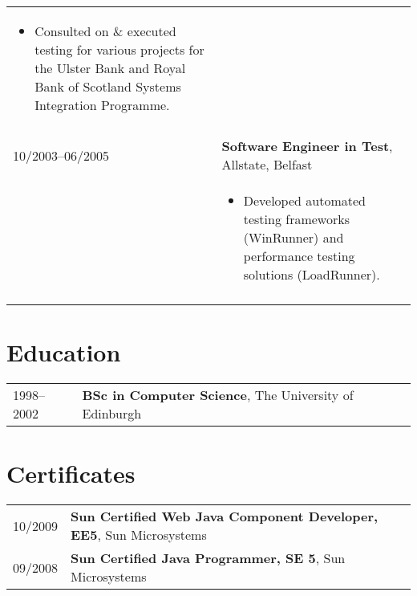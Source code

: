 \documentclass[2pt,a4paper]{article}
\newlength{\datecolumn}
\newlength{\textcolumn}
\begin{document}
\begin{longtable}{p{\datecolumn} p{\textcolumn}}
\begin{itemize}
                    \item Consulted on \& executed testing for various projects for the Ulster Bank and Royal Bank of Scotland Systems Integration Programme.
                   \end{itemize} \\ \\
10/2003--06/2005 & \textbf{Software Engineer in Test}, Allstate, Belfast \\
                 & \begin{itemize}
                        \item Developed automated testing frameworks (WinRunner) and performance testing solutions (LoadRunner).
                   \end{itemize} \\ \\
\end{longtable}

\section*{Education}
\begin{tabular}{p{\datecolumn} p{\textcolumn}}
1998--2002 & \textbf{BSc in Computer Science}, The University of Edinburgh \\
\end{tabular}

\section*{Certificates}
\begin{tabular}{p{\datecolumn} p{\textcolumn}}
10/2009 & \textbf{Sun Certified Web Java Component Developer, EE5}, Sun Microsystems \\
09/2008 & \textbf{Sun Certified Java Programmer, SE 5}, Sun Microsystems \\
\end{tabular}

\end{document}
